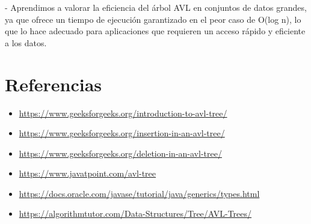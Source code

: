 \documentclass{article}
\begin{document}
    - Aprendimos a valorar la eficiencia del árbol AVL en conjuntos de datos grandes, ya que ofrece un tiempo de ejecución garantizado en el peor caso de O(log n), lo que lo hace adecuado para aplicaciones que requieren un acceso rápido y eficiente a los datos.
\clearpage
\section{Referencias}
\begin{itemize}	
        \item \url{https://www.geeksforgeeks.org/introduction-to-avl-tree/}	
        \item \url{https://www.geeksforgeeks.org/insertion-in-an-avl-tree/}
        \item \url{https://www.geeksforgeeks.org/deletion-in-an-avl-tree/}
        \item \url{https://www.javatpoint.com/avl-tree}
        \item \url{https://docs.oracle.com/javase/tutorial/java/generics/types.html}
        \item \url{https://algorithmtutor.com/Data-Structures/Tree/AVL-Trees/}
\end{itemize}
 
\end{document}

